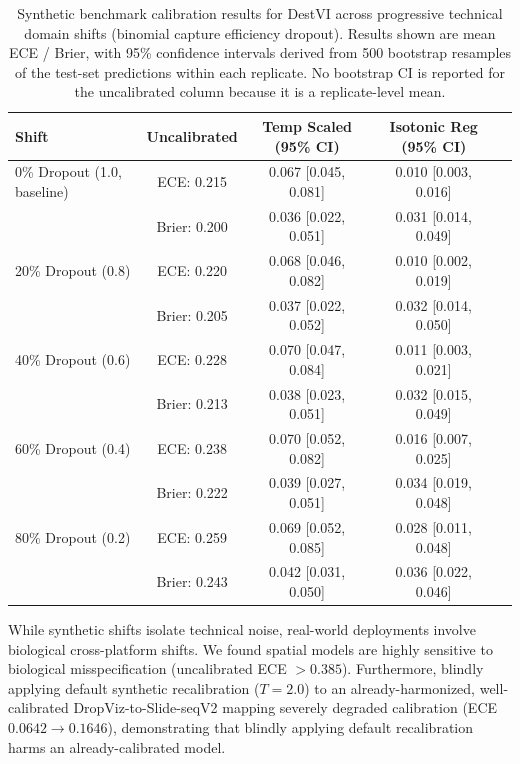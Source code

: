 \documentclass{jmlr} %
\begin{document}
\begin{table}[t!]
\centering
\footnotesize
\caption{Synthetic benchmark calibration results for DestVI across progressive technical domain shifts (binomial capture efficiency dropout). Results shown are mean ECE / Brier, with 95\% confidence intervals derived from 500 bootstrap resamples of the test-set predictions within each replicate. No bootstrap CI is reported for the uncalibrated column because it is a replicate-level mean.}
\label{tab:results}
\begin{tabular}{l c c c c}
\toprule
Shift & Uncalibrated & Temp Scaled (95\% CI) & Isotonic Reg (95\% CI) \\
\midrule
0\% Dropout (1.0, baseline) & ECE: 0.215 & 0.067 [0.045, 0.081] & 0.010 [0.003, 0.016] \\
                            & Brier: 0.200 & 0.036 [0.022, 0.051] & 0.031 [0.014, 0.049] & \\
20\% Dropout (0.8) & ECE: 0.220 & 0.068 [0.046, 0.082] & 0.010 [0.002, 0.019] \\
                   & Brier: 0.205 & 0.037 [0.022, 0.052] & 0.032 [0.014, 0.050] & \\
40\% Dropout (0.6) & ECE: 0.228 & 0.070 [0.047, 0.084] & 0.011 [0.003, 0.021] \\
                   & Brier: 0.213 & 0.038 [0.023, 0.051] & 0.032 [0.015, 0.049] & \\
60\% Dropout (0.4) & ECE: 0.238 & 0.070 [0.052, 0.082] & 0.016 [0.007, 0.025] \\
                   & Brier: 0.222 & 0.039 [0.027, 0.051] & 0.034 [0.019, 0.048] & \\
80\% Dropout (0.2) & ECE: 0.259 & 0.069 [0.052, 0.085] & 0.028 [0.011, 0.048] \\
                   & Brier: 0.243 & 0.042 [0.031, 0.050] & 0.036 [0.022, 0.046] & \\
\bottomrule
\end{tabular}
\end{table}

While synthetic shifts isolate technical noise, real-world deployments involve biological cross-platform shifts. We found spatial models are highly sensitive to biological misspecification (uncalibrated ECE $>0.385$). Furthermore, blindly applying default synthetic recalibration ($T=2.0$) to an already-harmonized, well-calibrated DropViz-to-Slide-seqV2 mapping severely degraded calibration (ECE $0.0642 \rightarrow 0.1646$), demonstrating that blindly applying default recalibration harms an already-calibrated model.
\end{document}

